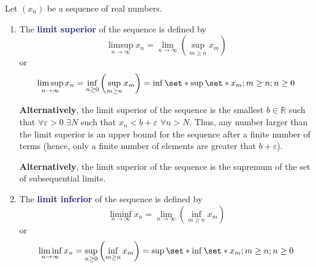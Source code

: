 \documentclass[11pt]{article}
\numberwithin{equation}{section}
\newcommand{\navy}[1]{\textcolor{MidnightBlue}{\bf #1}}
\theoremstyle{definition}
\theoremstyle{definition}
\newcommand\parens[1]{\left( #1 \right)}
\def\Set{\set*}%
\newcommand{\1}{\mathbbm 1}
\newcommand{\e}{\varepsilon}
\newcommand{\RR}{\mathbb R}
\begin{document}
\begin{definition}
	Let $\parens{x_n}$ be a sequence of real numbers.

	\begin{enumerate}
		\item The \navy{limit superior} of the sequence is defined by
			\begin{equation}
				\limsup\limits_{n \to \infty} x_n = \lim_{n \to \infty}\parens{\sup_{m \geq n} x_m}
			\end{equation}
			or
			\begin{equation}
				\limsup\limits_{n \to \infty} x_n = \inf_{n \geq 0} \parens{\sup_{m \geq n} x_m} = \inf\Set{\sup \Set{x_m; m \geq n}; n \geq 0}
			\end{equation}

			\textbf{Alternatively}, the limit superior of the sequence is the smallest $b \in \RR$ such that $\forall \e > 0$ $\exists N$ such that $x_n < b + \e$ $\forall n > N$. Thus, any number larger than the limit superior is an upper bound for the sequence after a finite number of terms (hence, only a finite number of elements are greater that $b + \e$).

			\textbf{Alternatively}, the limit superior of the sequence is the supremum of the set of subsequential limits. 

		\item The \navy{limit inferior} of the sequence is defined by
			\begin{equation}
				\liminf\limits_{n \to \infty} x_n = \lim_{n \to \infty}\parens{\inf_{m \geq n} x_m}
			\end{equation}
			or
			\begin{equation}
				\liminf\limits_{n \to \infty} x_n = \sup_{n \geq 0} \parens{\inf_{m \geq n} x_m} = \sup\Set{\inf \Set{x_m; m \geq n}; n \geq 0}
			\end{equation}	
	\end{enumerate}

\end{definition}
\end{document}

